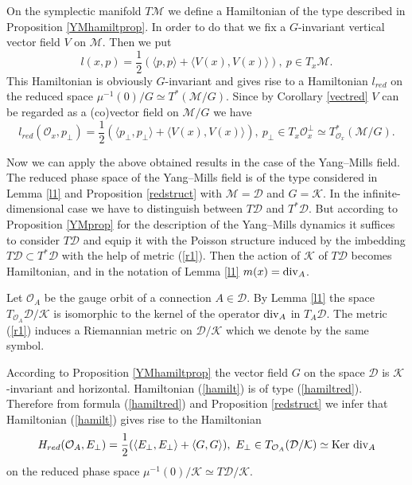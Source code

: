 \documentclass{amsart}
\begin{document}
On the symplectic manifold $T\mathcal{M}$ we define a Hamiltonian of the
type described in Proposition \ref{YMhamiltprop}. In order to do that we fix
a $G$-invariant vertical vector field $V$ on $\mathcal{M}$. Then we put
$$
l(x,p)=\frac 12 (\langle p,p\rangle +\langle V(x),V(x)\rangle ),~p\in T_x\mathcal{M}.
$$
This Hamiltonian is obviously $G$-invariant and gives rise to a Hamiltonian
$l_{red}$ on the reduced space $\mu^{-1}(0)/{G}\simeq T^*(\mathcal{M}/{G})$.
Since by Corollary \ref{vectred} $V$ can be regarded as a (co)vector field on $\mathcal{M}/{G}$
we have
\begin{equation}\label{hamiltred}
l_{red}(\mathcal{O}_x,p_\perp)=\frac 12
(\langle p_\perp,p_\perp\rangle +\langle V(x),V(x)\rangle ),~p_\perp \in T_x\mathcal{O}_x^\perp\simeq
T_{\mathcal{O}_x}^*(\mathcal{M}/{G}).
\end{equation}

Now we can apply the above obtained results in the case of the Yang--Mills field. 
The reduced phase space of the Yang--Mills field is of the type considered in Lemma \ref{l1} and Proposition \ref{redstruct} with $\mathcal{M}=\mathcal{D}$ and $G=\mathcal{K}$. In the infinite-dimensional case we have to distinguish between $T\mathcal{D}$ and $T^*\mathcal{D}$. But according to Proposition \ref{YMprop} for the description of the Yang--Mills dynamics it suffices to consider $T\mathcal{D}$ and equip it with the Poisson structure induced by the imbedding $T\mathcal{D}\subset T^*\mathcal{D}$ with the help of metric (\ref{r1}). Then the action of $\mathcal{K}$ of $T\mathcal{D}$ becomes Hamiltonian, and in the notation of Lemma \ref{l1} $m(x)={\rm div}_A$.

Let $\mathcal{O}_A$ be the gauge orbit of a connection $A\in \mathcal{D}$. By Lemma \ref{l1} the space $T_{\mathcal{O}_A}\mathcal{D}/\mathcal{K}$ is isomorphic to the kernel of the operator ${\rm div}_A$ in $T_A\mathcal{D}$. The metric (\ref{r1}) induces a Riemannian metric on $\mathcal{D}/\mathcal{K}$ which we denote by the same symbol.

According to Proposition \ref{YMhamiltprop} the vector field $G$ on the space $\mathcal{D}$ is $\mathcal{K}$-invariant and horizontal. Hamiltonian (\ref{hamilt}) is of type (\ref{hamiltred}). Therefore from formula (\ref{hamiltred}) and Proposition \ref{redstruct} we infer that Hamiltonian (\ref{hamilt}) gives rise to the Hamiltonian 
\begin{equation}\label{Hamiltred}
H_{red}(\mathcal{O}_A,E_\perp)=\frac 12
(\langle E_\perp,E_\perp\rangle +\langle G,G\rangle ),~E_\perp \in T_{\mathcal{O}_A}(\mathcal{D}/\mathcal{K})\simeq {\rm Ker~div}_A
\end{equation}
on the reduced phase space $\mu^{-1}(0)/\mathcal{K}\simeq T\mathcal{D}/\mathcal{K}$.
\end{document}
